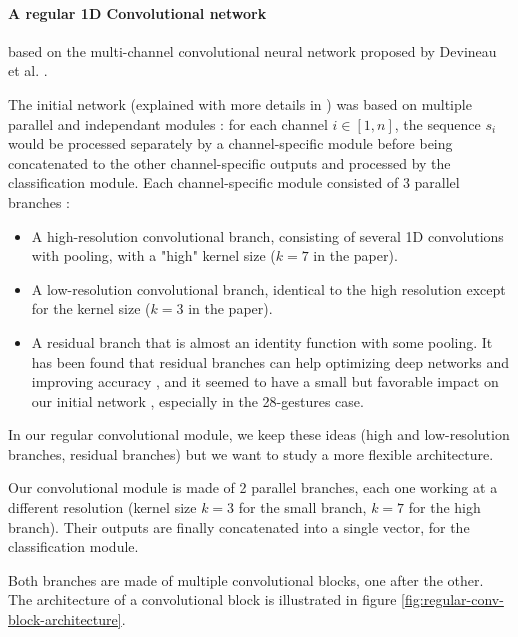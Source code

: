 \documentclass{article}
\begin{document}
\paragraph{A regular 1D Convolutional network} based on the multi-channel convolutional neural network proposed by Devineau et al. \cite{Devineau}.
\par
The initial network (explained with more details in \cite{Devineau}) was based on multiple parallel and independant modules : for each channel $i \in [1,n]$, the sequence $s_i$ would be processed separately by a channel-specific module before being concatenated to the other channel-specific outputs and processed by the classification module. Each channel-specific module consisted of 3 parallel branches :
\begin{itemize}
    \item A high-resolution convolutional branch, consisting of several 1D convolutions with pooling, with a "high" kernel size ($k=7$ in the paper).
    \item A low-resolution convolutional branch, identical to the high resolution except for the kernel size ($k=3$ in the paper).
    \item A residual branch that is almost an identity function with some pooling. It has been found that residual branches can help optimizing deep networks and improving accuracy \cite{He_2016-residual}, and it seemed to have a small but favorable impact on our initial network \cite{Devineau}, especially in the 28-gestures case.
\end{itemize}
\par
In our regular convolutional module, we keep these ideas (high and low-resolution branches, residual branches) but we want to study a more flexible architecture.
\par
Our convolutional module is made of 2 parallel branches, each one working at a different resolution (kernel size $k=3$ for the small branch, $k=7$ for the high branch). Their outputs are finally concatenated into a single vector, for the classification module.
\par
Both branches are made of multiple convolutional blocks, one after the other. The architecture of a convolutional block is illustrated in figure \ref{fig:regular-conv-block-architecture}.
\end{document}
